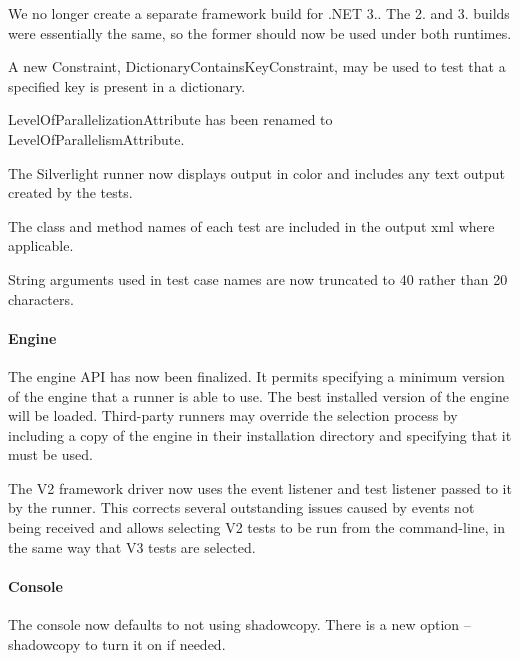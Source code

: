 \begin{DoxyItemize}
\item We no longer create a separate framework build for .N\+ET 3.. The 2. and 3. builds were essentially the same, so the former should now be used under both runtimes.
\item A new Constraint, Dictionary\+Contains\+Key\+Constraint, may be used to test that a specified key is present in a dictionary.
\item Level\+Of\+Parallelization\+Attribute has been renamed to Level\+Of\+Parallelism\+Attribute.
\item The Silverlight runner now displays output in color and includes any text output created by the tests.
\item The class and method names of each test are included in the output xml where applicable.
\item String arguments used in test case names are now truncated to 40 rather than 20 characters.
\end{DoxyItemize}

\paragraph*{Engine}


\begin{DoxyItemize}
\item The engine A\+PI has now been finalized. It permits specifying a minimum version of the engine that a runner is able to use. The best installed version of the engine will be loaded. Third-\/party runners may override the selection process by including a copy of the engine in their installation directory and specifying that it must be used.
\item The V2 framework driver now uses the event listener and test listener passed to it by the runner. This corrects several outstanding issues caused by events not being received and allows selecting V2 tests to be run from the command-\/line, in the same way that V3 tests are selected.
\end{DoxyItemize}

\paragraph*{Console}


\begin{DoxyItemize}
\item The console now defaults to not using shadowcopy. There is a new option --shadowcopy to turn it on if needed.
\end{DoxyItemize}

